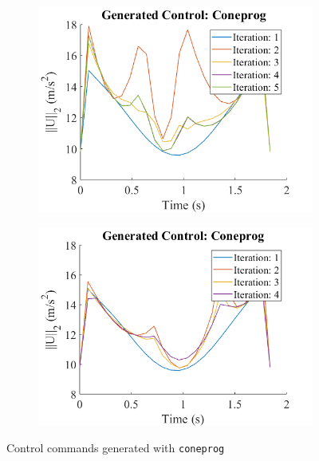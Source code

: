 \documentclass{article}
\begin{document}
\begin{figure}[H]
  \centering
  \begin{subfigure}{.5\textwidth}
    \centering
    \includegraphics[width=\linewidth]{images/coneprog/traj1_control.png}
    \label{fig:coneprog_contr1}
  \end{subfigure}%
  \begin{subfigure}{.5\textwidth}
    \centering
    \includegraphics[width=\linewidth]{images/coneprog/traj2_control.png}
    \label{fig:coneprog_contr2}
  \end{subfigure}
  \caption{Control commands generated with \texttt{coneprog}}
  \label{fig:coneprog_controls}
\end{figure}
\end{document}
